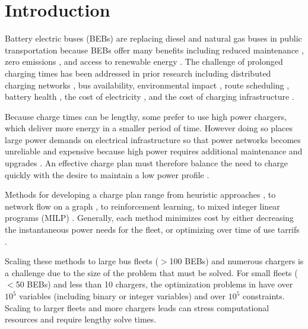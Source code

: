 \section{Introduction} 
\par Battery electric buses (BEBs) are replacing diesel and natural gas buses in public transportation because BEBs offer many benefits \cite{Mahmoud2016} including reduced maintenance \cite{poornesh_comparative_2020}, zero emissions \cite{kato_comparative_2013}, and access to renewable energy \cite{cheng_smart_2020}.  The challenge of prolonged charging times has been addressed in prior research including distributed charging networks \cite{Nimalsiri2020}, bus availability, environmental impact \cite{zhou_bi-objective_2021}, route scheduling \cite{Rinalde_Mixed_2020}, battery health \cite{houbbadi_optimal_2019}, the cost of electricity \cite{Leou_optimal_2017}, and the cost of charging infrastructure \cite{Wei2018}.  
\par Because charge times can be lengthy, some prefer to use high power chargers, which deliver more energy in a smaller period of time. However doing so places large power demands on electrical infrastructure \cite{stahleder_impact_2019} so that power networks becomes unreliable \cite{deb_impact_2017} and expensive because high power requires additional maintenance and upgrades \cite{boonraksa_impact_2019}. An effective charge plan must therefore balance the need to charge quickly with the desire to maintain a low power profile \cite{ojer_development_2020}.  
\par Methods for developing a charge plan range from heuristic approaches \cite{qin_numerical_2016}, to network flow on a graph \cite{whitaker_network_2023}, to reinforcement learning\cite{Wang2019}, to mixed integer linear programs (MILP) \cite{bagherinezhad_spatio-temporal_2020}. Generally, each method minimizes cost by either decreasing the instantaneous power needs for the fleet, or optimizing over time of use tarrifs \cite{He_2019_Fast}.  
\par Scaling these methods to large bus fleets ($>$100 BEBs) and numerous chargers is a challenge due to the size of the problem that must be solved.  For small fleets ($<$50 BEBs) and less than 10 chargers, the optimization problems in \cite{whitaker_network_2023,bagherinezhad_spatio-temporal_2020,He_2019_Fast} have over $10^5$ variables (including binary or integer variables) and over $10^5$ constraints.  Scaling to larger fleets and more chargers leads can stress computational resources and require lengthy solve times.  
